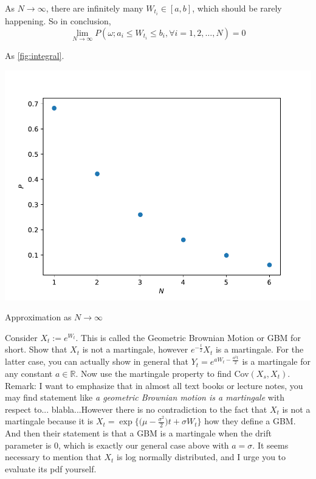 \begin{subproblem}[\roman*)]
        \item
        As $N\to\infty$, there are infinitely many $W_{t_i}\in[a,b]$,
        which should be rarely happening. So in conclusion,
        \[\lim_{N\to\infty}P\left(
            \omega;
            a_i\leq W_{t_i}\leq b_i,
            \forall i=1,2,\ldots,N
        \right)=0\]
        
        \item
        As 
        \cref{fig:integral}.
        \begin{marginfigure}
            \centering
            \includegraphics[width=\columnwidth]{integral}
            \caption{Approximation as $N\to\infty$}
            \label{fig:integral}
        \end{marginfigure}
    \end{subproblem}

    \problem
    \begin{question}
        Consider $X_t:=e^{W_t}$.  This is called the Geometric
        Brownian Motion or GBM for short.  Show that $X_t$
        is not a martingale, however $e^{-\frac{t}{2}}X_t$
        is a martingale.  For the latter case, you can actually
        show in general that $Y_t=e^{aW_t-\frac{a^2t}{2}}$ is
        a martingale for any constant $a\in\mathbb R$.  Now use
        the martingale property to find Cov$(X_s,X_t)$. 
        Remark:  I want to emphasize that in almost all
        text books or lecture notes, you may find statement
        like \emph{a geometric Brownian motion is a martingale}
        with respect to... blabla...However there is
        no contradiction to the fact that $X_t$ is not 
        a martingale because it is $X_t=\exp\Big\{\Big(\mu-\frac{\sigma^2}{2}\Big)t
        +\sigma W_t\Big\}$ how they define a GBM.  And then their statement is
        that a GBM is a martingale when the drift parameter is 0, which is 
        exactly our general case above with $a=\sigma$.  It seems necessary 
        to mention that $X_t$ is log normally distributed, and I urge you to 
        evaluate its pdf yourself. 
    \end{question}

